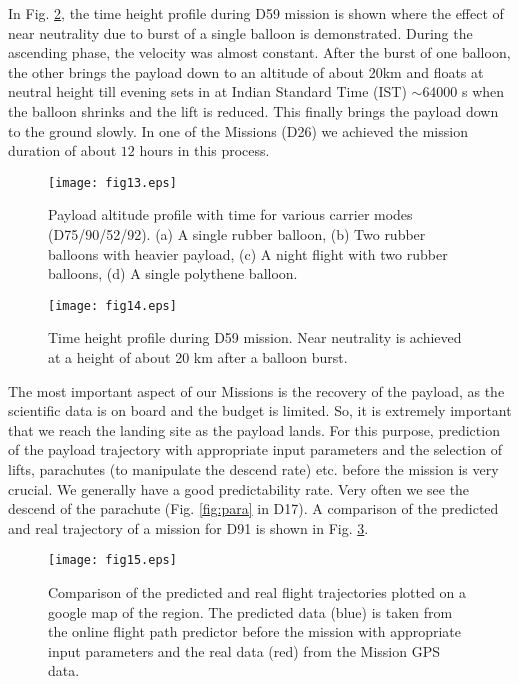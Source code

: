 In Fig. \ref{fig:d59th}, the time height profile during D59 mission is shown where the effect
of near neutrality due to burst of a single balloon is demonstrated. During the ascending phase,
the velocity was almost constant. After the burst of one balloon, the other brings the payload
down to an altitude of about 20km and floats at neutral height till evening sets in at Indian Standard
Time (IST) $\sim 64000$ s when the balloon shrinks and the lift is reduced. This finally brings 
the payload down to the ground slowly. In one of the Missions (D26) we achieved the mission
duration of about $12$ hours in this process.

\begin{figure}[h]
  \centering
  \texttt{[image: fig13.eps]}
  \caption{Payload altitude profile with time for various carrier modes (D75/90/52/92).
  (a) A single rubber balloon, (b) Two rubber balloons with heavier payload, 
(c)  A night flight with two rubber balloons, (d) A single polythene balloon.}
   \label{fig:tialt}
\end{figure}

\begin{figure}[h]
  \centering
  \texttt{[image: fig14.eps]}
  \caption{Time height profile during D59 mission. Near neutrality is achieved
at a height of about 20 km after a balloon burst. }
   \label{fig:d59th}
\end{figure}

The most important aspect of our Missions is the recovery of the payload, as the 
scientific data is on board and the budget is limited. So, it is extremely 
important that we reach the landing site as the payload lands.
For this purpose, prediction of the payload trajectory with appropriate input parameters
and the selection of lifts, parachutes (to manipulate the descend rate) 
etc. before the mission is very crucial. We generally have a good predictability
rate. Very often we see the descend of the parachute (Fig. \ref{fig:para} in D17).
A comparison of the predicted and real trajectory of 
a mission for D91 is shown in Fig. \ref{fig:trajcomp}.
\begin{figure}[h]
\centering
\texttt{[image: fig15.eps]}
\caption{Comparison of the predicted and real flight trajectories plotted on a google map 
of the region. The predicted data (blue) is taken from the online flight path predictor before
the mission with appropriate input parameters and the real data (red) 
from the Mission GPS data.} 
\label{fig:trajcomp}
\end{figure}

